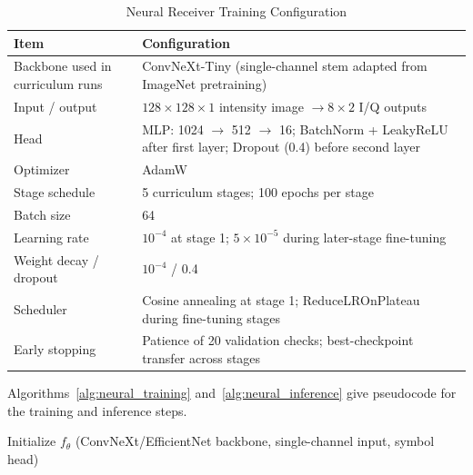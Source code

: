 \documentclass[journal]{IEEEtran}
\begin{document}

\begin{table}[htbp]
\centering
\caption{Neural Receiver Training Configuration}
\label{tab:neural_hparams}
\small
\renewcommand{\arraystretch}{1.1}
\begin{tabularx}{\columnwidth}{l X}
\toprule
\textbf{Item} & \textbf{Configuration} \\
\midrule
Backbone used in curriculum runs & ConvNeXt-Tiny (single-channel stem adapted from ImageNet pretraining) \\
Input / output & $128 \times 128 \times 1$ intensity image $\rightarrow 8 \times 2$ I/Q outputs \\
Head & MLP: 1024 $\rightarrow$ 512 $\rightarrow$ 16; BatchNorm + LeakyReLU after first layer; Dropout (0.4) before second layer \\
Optimizer & AdamW~\cite{loshchilov2019decoupled} \\
Stage schedule & 5 curriculum stages; 100 epochs per stage \\
Batch size & 64 \\
Learning rate & $10^{-4}$ at stage 1; $5 \times 10^{-5}$ during later-stage fine-tuning \\
Weight decay / dropout & $10^{-4}$ / 0.4 \\
Scheduler & Cosine annealing at stage 1; ReduceLROnPlateau during fine-tuning stages \\
Early stopping & Patience of 20 validation checks; best-checkpoint transfer across stages \\
\bottomrule
\end{tabularx}
\end{table}

Algorithms~\ref{alg:neural_training} and~\ref{alg:neural_inference} give pseudocode for the training and inference steps.

\begin{algorithm}[!t]
\caption{Neural Receiver Training}
\label{alg:neural_training}
Initialize $f_\theta$ (ConvNeXt/EfficientNet backbone, single-channel input, symbol head)\;
\end{algorithm}
\end{document}
